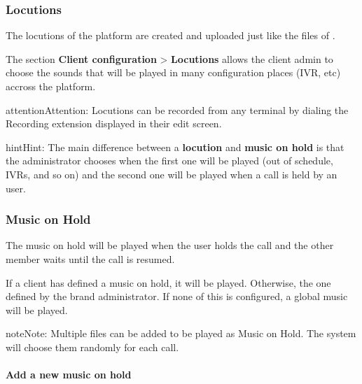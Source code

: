 \documentclass[letterpaper,10pt,english]{sphinxmanual}
\begin{document}
\subsubsection{Locutions}
\label{administration_portal/client/vpbx/multimedia/locutions:locutions}\label{administration_portal/client/vpbx/multimedia/locutions::doc}
The locutions of the platform are created and uploaded just like the files of
{\hyperref[administration_portal/client/vpbx/multimedia/music_on_hold:musiconhold]{}}.

The section \textbf{Client configuration} \textgreater{} \textbf{Locutions}  allows the client admin
to choose the sounds that will be played in many configuration places (IVR, etc)
accross the platform.

\begin{notice}{attention}{Attention:}
Locutions can be recorded from any terminal by dialing the
Recording extension displayed in their edit screen.
\end{notice}

\begin{notice}{hint}{Hint:}
The main difference between a \textbf{locution} and \textbf{music on hold} is
that the administrator chooses when the first one will be played (out of
schedule, IVRs, and so on) and the second one will be played when a call is
held by an user.
\end{notice}


\subsubsection{Music on Hold}
\label{administration_portal/client/vpbx/multimedia/music_on_hold:music-on-hold}\label{administration_portal/client/vpbx/multimedia/music_on_hold::doc}\label{administration_portal/client/vpbx/multimedia/music_on_hold:musiconhold}
The music on hold will be played when the user holds the call and the other
member waits until the call is resumed.

If a client has defined a music on hold, it will be played. Otherwise, the
one defined by the brand administrator. If none of this is configured, a global
music will be played.

\begin{notice}{note}{Note:}
Multiple files can be added to be played as Music on Hold. The system
will choose them randomly for each call.
\end{notice}
\paragraph{Add a new music on hold}
\end{document}
